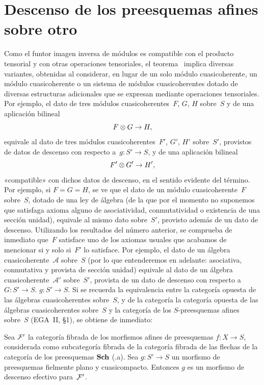 \section{Descenso de los preesquemas afines sobre otro}
\label{VIII.2}

Como el funtor imagen inversa de módulos es compatible con el producto
tensorial y con otras operaciones tensoriales, el teorema~
implica diversas variantes, obtenidas al considerar, en lugar de un solo
módulo cuasicoherente, un módulo cuasicoherente o un sistema de módulos
cuasicoherentes dotado de diversas estructuras adicionales que se expresan
mediante operaciones tensoriales. Por ejemplo, el dato de tres módulos
cuasicoherentes~$F$, $G$, $H$ sobre~$S$ y de una aplicación bilineal
$$
F\otimes G\to H\quoi,
$$
equivale al dato de tres módulos cuasicoherentes~$F'$, $G'$, $H'$ sobre~$S'$,
provistos de datos de descenso con respecto a~$g\colon S'\to S$, y de una
aplicación bilineal
$$
F'\otimes G'\to H'\quoi,
$$
«compatible» con dichos datos de descenso, en el sentido evidente del
término. Por ejemplo, si $F=G=H$, se ve que el dato de un módulo
cuasicoherente~$F$ sobre~$S$, dotado de una ley de álgebra (de la que por el
momento no suponemos que satisfaga axioma alguno de asociatividad,
conmutatividad o existencia de una sección unidad), equivale al mismo dato
sobre~$S'$, provisto además de un dato de descenso. Utilizando los resultados
del número anterior, se comprueba de inmediato que~$F$ satisface uno de los
axiomas usuales que acabamos de mencionar si y solo si~$F'$ lo satisface. Por
ejemplo, el dato de un álgebra cuasicoherente~$\mathcal{A}$ sobre~$S$ (por lo
que entenderemos en adelante: asociativa, conmutativa y provista de sección
unidad) equivale al dato de un álgebra cuasicoherente~$\mathcal{A}'$ sobre~$S'$,
provista de un dato de descenso con respecto a
{$G\colon S'\to S$.}
{$g\colon S'\to S$.}
Si se recuerda la equivalencia entre
{la categoría opuesta de las álgebras cuasicoherentes sobre~$S$, y de la
categoría}
{la categoría opuesta de las álgebras cuasicoherentes sobre~$S$ y la
categoría}
de los $S$-preesquemas afines sobre~$S$ (EGA~II, §1), se obtiene de inmediato:

\begin{theoreme}
\label{VIII.2.1}
Sea $\cal{F}'$ la categoría fibrada de los morfismos afines de preesquemas
$f\colon X\to S$, considerada como subcategoría fibrada de la categoría
fibrada
de las flechas de la categoría de los preesquemas $\Sch$
\textup{(.a)}. Sea $g\colon S'\to S$ un morfismo de preesquemas
fielmente plano y cuasicompacto. Entonces $g$ es un morfismo de descenso
efectivo para~$\cal{F}'$.
\end{theoreme}
